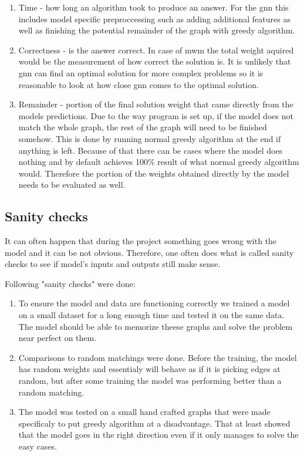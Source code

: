 \begin{enumerate}
\item Time - how long an algorithm took to produce an answer. For the \gls{gnn} this includes model specific preproccessing such as adding additional features as well as finishing the potential remainder of the graph with greedy algorithm.
\item Correctness - is the answer correct. In case of \gls{mwm} the total weight aquired would be the measurement of how correct the solution is. It is unlikely that \gls{gnn} can find an optimal solution for more complex problems so it is reasonable to look at how close \gls{gnn} comes to the optimal solution.
\item Remainder - portion of the final solution weight that came directly from the models predictions. Due to the way program is set up, if the model does not match the whole graph, the rest of the graph will need to be finished somehow. This is done by running normal greedy algorithm at the end if anything is left. Because of that there can be cases where the model does nothing and by default achieves 100\% result of what normal greedy algorithm would. Therefore the portion of the weights obtained directly by the model needs to be evaluated as well.
\end{enumerate}

\subsection{Sanity checks}

It can often happen that during the project something goes wrong with the model and it can be not obvious. Therefore, one often does what is called sanity checks to see if model's inputs and outputs still make sense. 

Following "sanity checks" were done:

\begin{enumerate}
\item To ensure the model and data are functioning correctly we trained a model on a small dataset for a long enough time and tested it on the same data. The model should be able to memorize theese graphs and solve the problem near perfect on them.

\item Comparisons to random matchings were done. Before the training, the model has random weights and essentialy will behave as if it is picking edges at random, but after some training the model was performing better than a random matching.

\item The model was tested on a small hand crafted graphs that were made specificaly to put greedy algorithm at a disadvantage. That at least showed that the model goes in the right direction even if it only manages to solve the easy cases.
\end{enumerate}	

